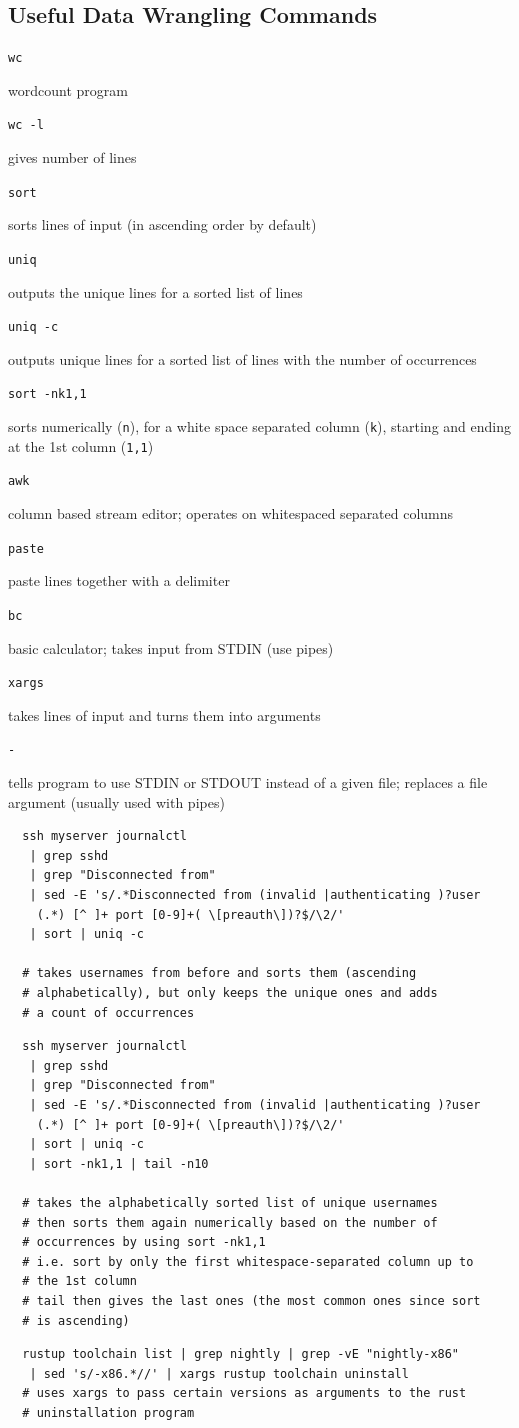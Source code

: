 \documentclass[letterpaper,12pt]{article}
\newcommand*{\lstitem}[1]{
  \setbox0\hbox{\lstinline{#1}}
  \item[\usebox0]
}
\begin{document}
\subsection{Useful Data Wrangling Commands}
\begin{description}
 \lstitem{wc} wordcount program
 \lstitem{wc -l} gives number of lines
 \lstitem{sort} sorts lines of input (in ascending order by default)
 \lstitem{uniq} outputs the unique lines for a sorted list of lines
 \lstitem{uniq -c} outputs unique lines for a sorted list of lines with the number of occurrences
 \lstitem{sort -nk1,1} sorts numerically (\lstinline{n}), for a white space separated column (\lstinline{k}), starting and ending at the 1st column (\lstinline{1,1})
 \lstitem{awk} column based stream editor; operates on whitespaced separated columns
 \lstitem{paste} paste lines together with a delimiter
 \lstitem{bc} basic calculator; takes input from STDIN (use pipes)
 \lstitem{xargs} takes lines of input and turns them into arguments
 \lstitem{-} tells program to use STDIN or STDOUT instead of a given file; replaces a file argument (usually used with pipes)
\end{description}

\begin{lstlisting}
  ssh myserver journalctl
   | grep sshd
   | grep "Disconnected from"
   | sed -E 's/.*Disconnected from (invalid |authenticating )?user
    (.*) [^ ]+ port [0-9]+( \[preauth\])?$/\2/'
   | sort | uniq -c

  # takes usernames from before and sorts them (ascending
  # alphabetically), but only keeps the unique ones and adds
  # a count of occurrences
\end{lstlisting}

\begin{lstlisting}
  ssh myserver journalctl
   | grep sshd
   | grep "Disconnected from"
   | sed -E 's/.*Disconnected from (invalid |authenticating )?user
    (.*) [^ ]+ port [0-9]+( \[preauth\])?$/\2/'
   | sort | uniq -c
   | sort -nk1,1 | tail -n10

  # takes the alphabetically sorted list of unique usernames
  # then sorts them again numerically based on the number of
  # occurrences by using sort -nk1,1
  # i.e. sort by only the first whitespace-separated column up to
  # the 1st column
  # tail then gives the last ones (the most common ones since sort
  # is ascending)
\end{lstlisting}

\begin{lstlisting}
  rustup toolchain list | grep nightly | grep -vE "nightly-x86"
   | sed 's/-x86.*//' | xargs rustup toolchain uninstall
  # uses xargs to pass certain versions as arguments to the rust
  # uninstallation program
\end{lstlisting}
\end{document}
